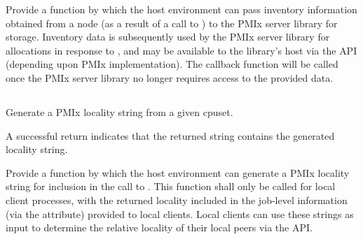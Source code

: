 \descr

Provide a function by which the host environment can pass inventory information obtained from a node (as a result of a call to ) to the \ac{PMIx} server library for storage. Inventory data is subsequently used by the \ac{PMIx} server library for allocations in response to , and may be available to the library's host via the  \ac{API} (depending upon \ac{PMIx} implementation). The  callback function will be called once the \ac{PMIx} server library no longer requires access to the provided data.

\subsection{}

\summary

Generate a \ac{PMIx} locality string from a given cpuset.

\format


\begin{arglist}
\end{arglist}

A successful return indicates that the returned string contains the generated locality string.

\returnsimple

\descr

Provide a function by which the host environment can generate a \ac{PMIx} locality string for inclusion in the call to . This function shall only be called for local client processes, with the returned locality included in the job-level information (via the  attribute) provided to local clients. Local clients can use these strings as input to determine the relative locality of their local peers via the  \ac{API}.

